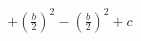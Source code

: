 \documentclass[preview]{standalone}
\begin{document}
\begin{align*}
+ \left(\frac{b}{2}\right)^2 - \left(\frac{b}{2}\right)^2 + c
\end{align*}
\end{document}
